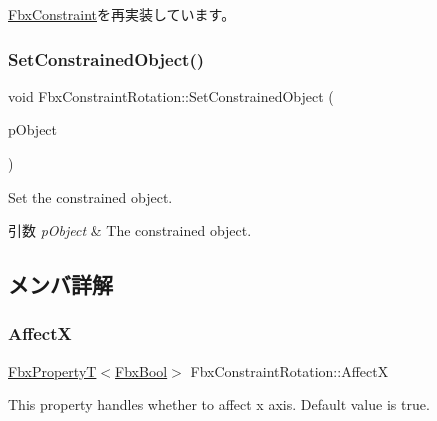 \hyperlink{class_fbx_constraint_adbeea66a1a605531a019aa6df90dc45b}{Fbx\+Constraint}を再実装しています。

\mbox{\label{class_fbx_constraint_rotation_ae7d40f146877a4defd18cd41692fa78e}} 
\subsubsection{\texorpdfstring{Set\+Constrained\+Object()}{SetConstrainedObject()}}
{\footnotesize\ttfamily void Fbx\+Constraint\+Rotation\+::\+Set\+Constrained\+Object (\begin{DoxyParamCaption}\item[{\hyperlink{class_fbx_object}{Fbx\+Object} $\ast$}]{p\+Object }\end{DoxyParamCaption})}

Set the constrained object. 
\begin{DoxyParams}{引数}
{\em p\+Object} & The constrained object. \\
\hline
\end{DoxyParams}


\subsection{メンバ詳解}
\mbox{\label{class_fbx_constraint_rotation_a2fc6ae9614bcc41039d4abd37d3186aa}} 
\subsubsection{\texorpdfstring{AffectX}{AffectX}}
{\footnotesize\ttfamily \hyperlink{class_fbx_property_t}{Fbx\+PropertyT}$<$\hyperlink{fbxtypes_8h_a92e0562b2fe33e76a242f498b362262e}{Fbx\+Bool}$>$ Fbx\+Constraint\+Rotation\+::\+AffectX}

This property handles whether to affect x axis. Default value is true. \mbox{\label{class_fbx_constraint_rotation_a8b611c9fd76921a2780254dee0d33870}} 
